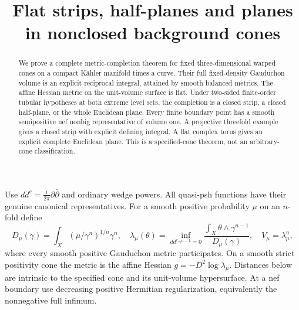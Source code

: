 \documentclass[11pt]{article}
\title{Flat strips, half-planes and planes in nonclosed background cones}
\author{}
\date{}
\newcommand{\ddc}{dd^c}
\theoremstyle{remark}\newtheorem{remark}[theorem]{Remark}
\begin{document}
\maketitle
\begin{abstract}
We prove a complete metric-completion theorem for fixed three-dimensional
warped cones on a compact K\"ahler manifold times a curve. Their full
fixed-density Gauduchon volume is an explicit reciprocal integral, attained
by smooth balanced metrics. The affine Hessian metric on the unit-volume
surface is flat. Under two-sided finite-order tubular hypotheses at both
extreme level sets, the completion is a closed strip, a closed half-plane,
or the whole Euclidean plane. Every finite boundary point has a smooth
semipositive nef nonbig representative of volume one. A projective
threefold example gives a closed strip with explicit defining integral.
A flat complex torus gives an explicit complete Euclidean plane.
This is a specified-cone theorem, not an arbitrary-cone classification.
\end{abstract}

Use $\ddc=\frac{i}{2\pi}\partial\bar\partial$ and ordinary wedge powers.
All quasi-psh functions have their genuine canonical representatives.
For a smooth positive probability $\mu$ on an $n$-fold define
\[
 D_\mu(\gamma)=\int_X(\mu/\gamma^n)^{1/n}\gamma^n,
 \quad\lambda_\mu(\theta)=\inf_{\ddc\gamma^{n-1}=0}
 \frac{\int_X\theta\wedge\gamma^{n-1}}{D_\mu(\gamma)},
 \quad V_\mu=\lambda_\mu^n,
\]
where every smooth positive Gauduchon metric participates. On a smooth
strict positivity cone the metric is the affine Hessian
$g=-D^2\log\lambda_\mu$. Distances below are intrinsic to the specified
cone and its unit-volume hypersurface. At a nef boundary use decreasing
positive Hermitian regularization, equivalently the nonnegative full infimum.
\end{document}
